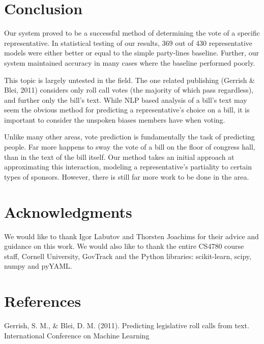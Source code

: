 \documentclass[11pt,letterpaper,twocolumn]{article}
\begin{document}
\section{Conclusion}
Our system proved to be a successful method of determining the vote of a specific representative. In statistical testing of our results, 369 out of 430 representative models were either better or equal to the simple party-lines baseline. Further, our system maintained accuracy in many cases where the baseline performed poorly.

This topic is largely untested in the field. The one related publishing (Gerrish \& Blei, 2011) considers only roll call votes (the majority of which pass regardless), and further only the bill's text. While NLP based analysis of a bill's text may seem the obvious method for predicting a representative's choice on a bill, it is important to consider the unspoken biases members have when voting. 

Unlike many other areas, vote prediction is fundamentally the task of predicting people. Far more happens to sway the vote of a bill on the floor of congress hall, than in the text of the bill itself. Our method takes an initial approach at approximating this interaction, modeling a representative's partiality to certain types of sponsors. However, there is still far more work to be done in the area.


\section*{Acknowledgments}

We would like to thank Igor Labutov and Thorsten Joachims for their advice and guidance on this work. We would also like to thank the entire CS4780 course staff, Cornell University, GovTrack and the Python libraries: scikit-learn, scipy, numpy and pyYAML.

\pagebreak

\section*{References}

Gerrish, S. M., \& Blei, D. M. (2011). Predicting legislative roll calls from text. International Conference on Machine Learning
\end{document}
